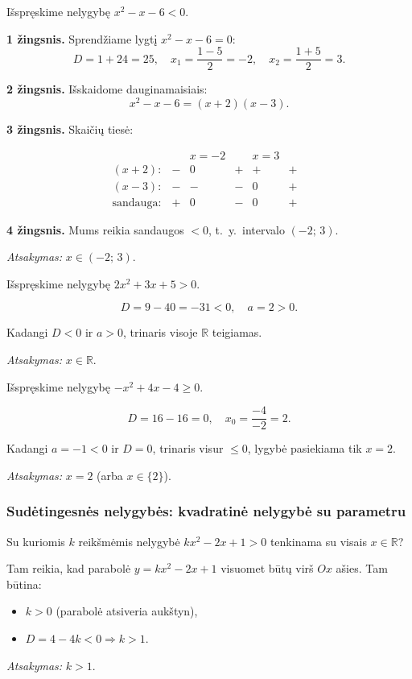 \begin{example}
Išspręskime nelygybę $x^2 - x - 6 < 0$.

\textbf{1 žingsnis.} Sprendžiame lygtį $x^2 - x - 6 = 0$:
\[
D = 1 + 24 = 25, \quad x_1 = \frac{1-5}{2} = -2, \quad x_2 = \frac{1+5}{2} = 3.
\]

\textbf{2 žingsnis.} Išskaidome dauginamaisiais:
\[
x^2 - x - 6 = (x + 2)(x - 3).
\]

\textbf{3 žingsnis.} Skaičių tiesė:

\[
\begin{array}{ccccccc}
& & x = -2 & & x = 3 & & \\
\hline
(x+2): & - & 0 & + & + & + & \\
(x-3): & - & - & - & 0 & + & \\
\hline
\text{sandauga}: & + & 0 & - & 0 & + &
\end{array}
\]

\textbf{4 žingsnis.} Mums reikia sandaugos $< 0$, t.~y.\ intervalo $(-2;\, 3)$.

\textit{Atsakymas:} $x \in (-2;\, 3)$.
\end{example}

\begin{example}
Išspręskime nelygybę $2x^2 + 3x + 5 > 0$.

\[
D = 9 - 40 = -31 < 0, \quad a = 2 > 0.
\]

Kadangi $D < 0$ ir $a > 0$, trinaris visoje $\mathbb{R}$ teigiamas.

\textit{Atsakymas:} $x \in \mathbb{R}$.
\end{example}

\begin{example}
Išspręskime nelygybę $-x^2 + 4x - 4 \geq 0$.

\[
D = 16 - 16 = 0, \quad x_0 = \frac{-4}{-2} = 2.
\]

Kadangi $a = -1 < 0$ ir $D = 0$, trinaris visur $\leq 0$, lygybė pasiekiama tik $x = 2$.

\textit{Atsakymas:} $x = 2$ (arba $x \in \{2\}$).
\end{example}

\subsubsection*{Sudėtingesnės nelygybės: kvadratinė nelygybė su parametru}

\begin{example}
Su kuriomis $k$ reikšmėmis nelygybė $kx^2 - 2x + 1 > 0$ tenkinama su visais $x \in \mathbb{R}$?

Tam reikia, kad parabolė $y = kx^2 - 2x + 1$ visuomet būtų virš $Ox$ ašies. Tam būtina:
\begin{itemize}
    \item $k > 0$ (parabolė atsiveria aukštyn),
    \item $D = 4 - 4k < 0 \Rightarrow k > 1$.
\end{itemize}

\textit{Atsakymas:} $k > 1$.
\end{example}

